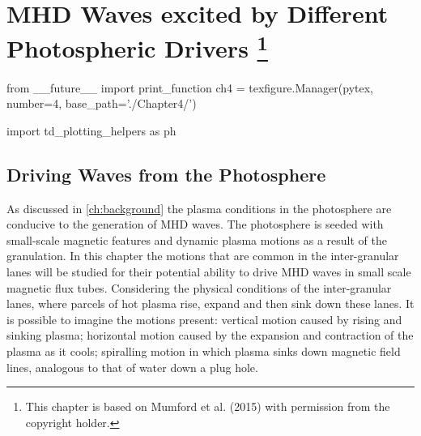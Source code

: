 
\chapter[MHD Waves excited by Different Photospheric Drivers]{MHD Waves excited by Different Photospheric Drivers \footnote{This chapter is based on Mumford et al. (2015) with permission from the copyright holder.}}\label{ch:drivers}

\begin{pycode}[chapter4]
from __future__ import print_function
ch4 = texfigure.Manager(pytex, number=4, base_path='./Chapter4/')

import td_plotting_helpers as ph
\end{pycode}


\section{Driving Waves from the Photosphere}\label{sec:5drivers}

As discussed in \cref{ch:background} the plasma conditions in the photosphere are conducive to the generation of MHD waves.
The photosphere is seeded with small-scale magnetic features and dynamic plasma motions as a result of the granulation.
In this chapter the motions that are common in the inter-granular lanes will be studied for their potential ability to drive MHD waves in small scale magnetic flux tubes.
Considering the physical conditions of the inter-granular lanes, where parcels of hot plasma rise, expand and then sink down these lanes.
It is possible to imagine the motions present: vertical motion caused by rising and sinking plasma; horizontal motion caused by the expansion and contraction of the plasma as it cools; spiralling motion in which plasma sinks down magnetic field lines, analogous to that of water down a plug hole.

